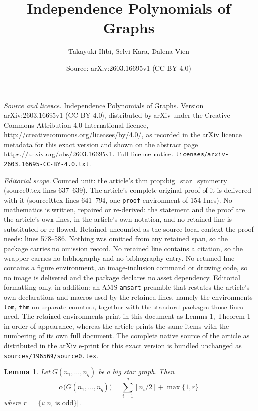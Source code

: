 \documentclass[10pt,a4paper]{amsart}
\title{Independence Polynomials of Graphs}
\author{Takayuki Hibi, Selvi Kara, Dalena Vien}
\date{Source: arXiv:2603.16695v1 (CC BY 4.0)}
\newtheorem{lem}{Lemma}
\begin{document}
\maketitle

\noindent\emph{Source and licence.} Independence Polynomials of Graphs. Version arXiv:2603.16695v1 (CC BY 4.0), distributed by arXiv under the Creative Commons Attribution 4.0 International licence, http://creativecommons.org/licenses/by/4.0/, as recorded in the arXiv licence metadata for this exact version and shown on the abstract page https://arxiv.org/abs/2603.16695v1. Full licence notice: \texttt{licenses/arxiv-2603.16695-CC-BY-4.0.txt}.\par\smallskip

\noindent\textit{Editorial scope.} Counted unit: the article's thm prop:big\_star\_symmetry (source0.tex lines 637--639). The article's complete original proof of it is delivered with it (source0.tex lines 641--794, one \texttt{proof} environment of 154 lines). No mathematics is written, repaired or re-derived: the statement and the proof are the article's own lines, in the article's own notation, and no retained line is substituted or re-flowed.  Retained uncounted as the source-local context the proof needs: lines 578--586.  Nothing was omitted from any retained span, so the package carries no omission record.  No retained line contains a citation, so the wrapper carries no bibliography and no bibliography entry.  No retained line contains a figure environment, an image-inclusion command or drawing code, so no image is delivered and the package declares no asset dependency.  Editorial formatting only, in addition: an AMS \texttt{amsart} preamble that restates the article's own declarations and macros used by the retained lines, namely the environments \texttt{lem}, \texttt{thm} on separate counters, together with the standard packages those lines need.  The retained environments print in this document as Lemma 1, Theorem 1 in order of appearance, whereas the article prints the same items with the numbering of its own full document.  The complete native source of the article as distributed in the arXiv e-print for this exact version is bundled unchanged as \texttt{sources/196569/source0.tex}.
\begin{lem}\label{lem:alpha_big_star}
Let $G(n_1,\ldots,n_q)$ be a big star graph. Then
\[
\alpha\bigl(G(n_1,\ldots,n_q)\bigr)
=
\sum_{i=1}^q \left\lfloor n_i/2\right\rfloor+\max\{1,r\}
\]
where  \(r=|\{ i : n_i \text{ is odd} \}|\).
\end{lem}
\end{document}
